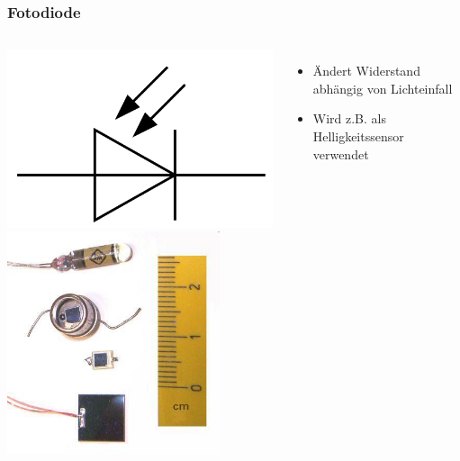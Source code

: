 \begin{frame}
    \frametitle{Fotodiode}
    \begin{columns}[c]
        \column[c]{5cm}
        \begin{center}
            \includegraphics[width=1\textwidth]{a05/Symbol_Photodiode.png}\\
            \includegraphics[width=0.8\textwidth]{a05/Fotodio.jpg}
            \tiny \hyperlink{refs}{\cite{wm}}
        \end{center}
        \column{5cm}
    \begin{itemize}
			\item Ändert Widerstand abhängig von Lichteinfall 
			\item Wird z.B. als Helligkeitssensor verwendet
    \end{itemize}
    \end{columns}
\end{frame}

